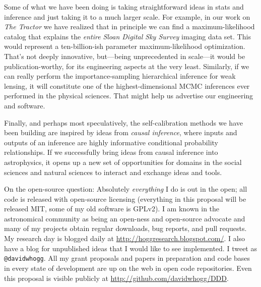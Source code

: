 \documentclass[11pt, letterpaper]{article}
\begin{document}
Some of what we have been doing is taking straightforward ideas in
stats and inference and just taking it to a much larger scale.
For example, in our work on \textsl{The Tractor} we have realized that
in principle we can find a maximum-likelihood catalog that explains
the \emph{entire} \textsl{Sloan Digital Sky Survey} imaging data set.
This would represent a ten-billion-ish parameter maximum-likelihood
optimization.
That's not deeply innovative, but---being unprecedented in
scale---it
would be publication-worthy, for its engineering aspects at the very
least.
Similarly, if we can really perform the importance-sampling
hierarchical inference for weak lensing, it will constitute one of the
highest-dimensional MCMC inferences ever performed in the physical
sciences.
That might help us advertise our engineering and software.

Finally, and perhaps most speculatively, the self-calibration methods
we have been building are inspired by ideas from \emph{causal
  inference}, where inputs and outputs of an inference are highly
informative conditional probability relationships.
If we successfully bring ideas from causal inference into
astrophysics, it opens up a new set of opportunities for domains in
the social sciences and natural sciences to interact and exchange
ideas and tools.

On the open-source question:
Absolutely \emph{everything} I do is out in the open; all code is released
with open-source licensing (everything in this proposal will be
released MIT, some of my old software is GPLv2).
I am known in the astronomical community as being an open-ness and
open-source advocate and many of my projects obtain regular downloads,
bug reports, and pull requests.
My research day is blogged daily at
\url{http://hoggresearch.blogspot.com/}.
I also have a blog for unpublished ideas that I would like to see
implemented.
I tweet as \texttt{@davidwhogg}.
All my grant proposals and papers in preparation and code bases in
every state of development are up on the web in open code
repositories.
Even this proposal is visible publicly at
\url{http://github.com/davidwhogg/DDD}.
\end{document}
